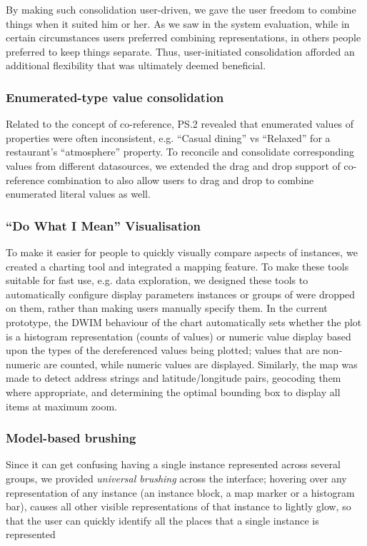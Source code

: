 \documentclass{sigchi}
\begin{document}
By making such consolidation user-driven, we gave the user freedom to combine things when it suited him or her. As we saw in the system evaluation, while in certain circumstances users preferred combining representations, in others people preferred to keep things separate.  Thus, user-initiated consolidation afforded an additional flexibility that was ultimately deemed beneficial.

\subsubsection{Enumerated-type value consolidation}

Related to the concept of co-reference, PS.2 revealed that enumerated values of properties were often inconsistent, e.g. ``Casual dining'' vs ``Relaxed'' for a restaurant's ``atmosphere'' property. To reconcile and consolidate corresponding values from different  datasources, we extended the drag and drop support of co-reference combination to also allow users to drag and drop to combine enumerated literal values as well.  

\subsubsection{``Do What I Mean'' Visualisation}

To make it easier for people to quickly visually compare aspects of instances, we created a charting tool and integrated a mapping feature.  To make these tools suitable for fast use, e.g. data exploration, we designed these tools to automatically configure display parameters instances or groups of were dropped on them, rather than making users manually specify them. In the current prototype, the DWIM behaviour of the chart automatically sets whether the plot is a histogram representation (counts of values) or numeric value display based upon the types of the dereferenced values being plotted; values that are non-numeric are counted, while numeric values are displayed.    Similarly, the map was made to detect address strings and latitude/longitude pairs, geocoding them where appropriate, and determining the optimal bounding box to display all items at maximum zoom.

\subsubsection{Model-based brushing}
Since it can get confusing having a single instance represented across several groups, we provided \emph{universal brushing} across the interface; hovering over any representation of any instance (an instance block, a map marker or a histogram bar), causes all other visible representations of that instance to lightly glow, so that the user can quickly identify all the places that a single instance is represented
\end{document}
